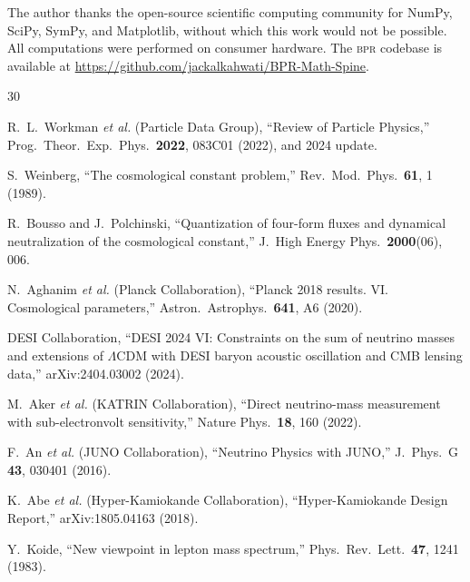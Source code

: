 \documentclass[aps,prd,twocolumn,superscriptaddress,longbibliography,nofootinbib]{revtex4-2}
\newcommand{\bpr}{\textsc{bpr}}
\begin{document}
\begin{acknowledgments}
The author thanks the open-source scientific computing community
for NumPy, SciPy, SymPy, and Matplotlib, without which this work
would not be possible.  All computations were performed on consumer
hardware.  The \bpr{} codebase is available at
\url{https://github.com/jackalkahwati/BPR-Math-Spine}.
\end{acknowledgments}


\begin{thebibliography}{30}

R.~L.~Workman \textit{et al.} (Particle Data Group),
``Review of Particle Physics,''
Prog.\ Theor.\ Exp.\ Phys.\ \textbf{2022}, 083C01 (2022),
and 2024 update.

S.~Weinberg,
``The cosmological constant problem,''
Rev.\ Mod.\ Phys.\ \textbf{61}, 1 (1989).

R.~Bousso and J.~Polchinski,
``Quantization of four-form fluxes and dynamical neutralization of the
cosmological constant,''
J.\ High Energy Phys.\ \textbf{2000}(06), 006.

N.~Aghanim \textit{et al.} (Planck Collaboration),
``Planck 2018 results. VI. Cosmological parameters,''
Astron.\ Astrophys.\ \textbf{641}, A6 (2020).

DESI Collaboration,
``DESI 2024 VI: Constraints on the sum of neutrino masses and
extensions of $\Lambda$CDM with DESI baryon acoustic oscillation
and CMB lensing data,''
arXiv:2404.03002 (2024).

M.~Aker \textit{et al.} (KATRIN Collaboration),
``Direct neutrino-mass measurement with sub-electronvolt sensitivity,''
Nature Phys.\ \textbf{18}, 160 (2022).

F.~An \textit{et al.} (JUNO Collaboration),
``Neutrino Physics with JUNO,''
J.\ Phys.\ G \textbf{43}, 030401 (2016).

K.~Abe \textit{et al.} (Hyper-Kamiokande Collaboration),
``Hyper-Kamiokande Design Report,''
arXiv:1805.04163 (2018).

Y.~Koide,
``New viewpoint in lepton mass spectrum,''
Phys.\ Rev.\ Lett.\ \textbf{47}, 1241 (1983).


\end{thebibliography}
\end{document}
